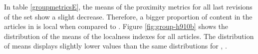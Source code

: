 
In table \ref{groupmetricsE}, the means of the proximity metrics for all last revisions of the set show a slight decrease.
Therefore, a bigger proportion of content in the articles in  is local when compared to .  
Figure \ref{fig:group-h910b} shows the distribution of the means of the localness indexes for all articles.
The distribution of means displays slightly lower values than the same distributions for , .


